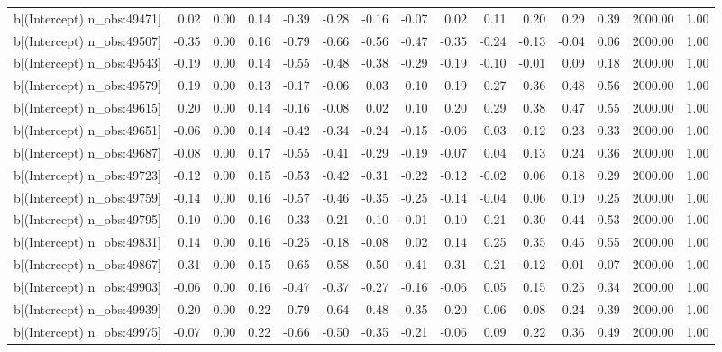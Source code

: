 \begin{table}[ht]
\begin{tabular}{rrrrrrrrrrrrrrr}
  b[(Intercept) n\_obs:49471] & 0.02 & 0.00 & 0.14 & -0.39 & -0.28 & -0.16 & -0.07 & 0.02 & 0.11 & 0.20 & 0.29 & 0.39 & 2000.00 & 1.00 \\ 
  b[(Intercept) n\_obs:49507] & -0.35 & 0.00 & 0.16 & -0.79 & -0.66 & -0.56 & -0.47 & -0.35 & -0.24 & -0.13 & -0.04 & 0.06 & 2000.00 & 1.00 \\ 
  b[(Intercept) n\_obs:49543] & -0.19 & 0.00 & 0.14 & -0.55 & -0.48 & -0.38 & -0.29 & -0.19 & -0.10 & -0.01 & 0.09 & 0.18 & 2000.00 & 1.00 \\ 
  b[(Intercept) n\_obs:49579] & 0.19 & 0.00 & 0.13 & -0.17 & -0.06 & 0.03 & 0.10 & 0.19 & 0.27 & 0.36 & 0.48 & 0.56 & 2000.00 & 1.00 \\ 
  b[(Intercept) n\_obs:49615] & 0.20 & 0.00 & 0.14 & -0.16 & -0.08 & 0.02 & 0.10 & 0.20 & 0.29 & 0.38 & 0.47 & 0.55 & 2000.00 & 1.00 \\ 
  b[(Intercept) n\_obs:49651] & -0.06 & 0.00 & 0.14 & -0.42 & -0.34 & -0.24 & -0.15 & -0.06 & 0.03 & 0.12 & 0.23 & 0.33 & 2000.00 & 1.00 \\ 
  b[(Intercept) n\_obs:49687] & -0.08 & 0.00 & 0.17 & -0.55 & -0.41 & -0.29 & -0.19 & -0.07 & 0.04 & 0.13 & 0.24 & 0.36 & 2000.00 & 1.00 \\ 
  b[(Intercept) n\_obs:49723] & -0.12 & 0.00 & 0.15 & -0.53 & -0.42 & -0.31 & -0.22 & -0.12 & -0.02 & 0.06 & 0.18 & 0.29 & 2000.00 & 1.00 \\ 
  b[(Intercept) n\_obs:49759] & -0.14 & 0.00 & 0.16 & -0.57 & -0.46 & -0.35 & -0.25 & -0.14 & -0.04 & 0.06 & 0.19 & 0.25 & 2000.00 & 1.00 \\ 
  b[(Intercept) n\_obs:49795] & 0.10 & 0.00 & 0.16 & -0.33 & -0.21 & -0.10 & -0.01 & 0.10 & 0.21 & 0.30 & 0.44 & 0.53 & 2000.00 & 1.00 \\ 
  b[(Intercept) n\_obs:49831] & 0.14 & 0.00 & 0.16 & -0.25 & -0.18 & -0.08 & 0.02 & 0.14 & 0.25 & 0.35 & 0.45 & 0.55 & 2000.00 & 1.00 \\ 
  b[(Intercept) n\_obs:49867] & -0.31 & 0.00 & 0.15 & -0.65 & -0.58 & -0.50 & -0.41 & -0.31 & -0.21 & -0.12 & -0.01 & 0.07 & 2000.00 & 1.00 \\ 
  b[(Intercept) n\_obs:49903] & -0.06 & 0.00 & 0.16 & -0.47 & -0.37 & -0.27 & -0.16 & -0.06 & 0.05 & 0.15 & 0.25 & 0.34 & 2000.00 & 1.00 \\ 
  b[(Intercept) n\_obs:49939] & -0.20 & 0.00 & 0.22 & -0.79 & -0.64 & -0.48 & -0.35 & -0.20 & -0.06 & 0.08 & 0.24 & 0.39 & 2000.00 & 1.00 \\ 
  b[(Intercept) n\_obs:49975] & -0.07 & 0.00 & 0.22 & -0.66 & -0.50 & -0.35 & -0.21 & -0.06 & 0.09 & 0.22 & 0.36 & 0.49 & 2000.00 & 1.00 \\ 

\end{tabular}
\end{table}
